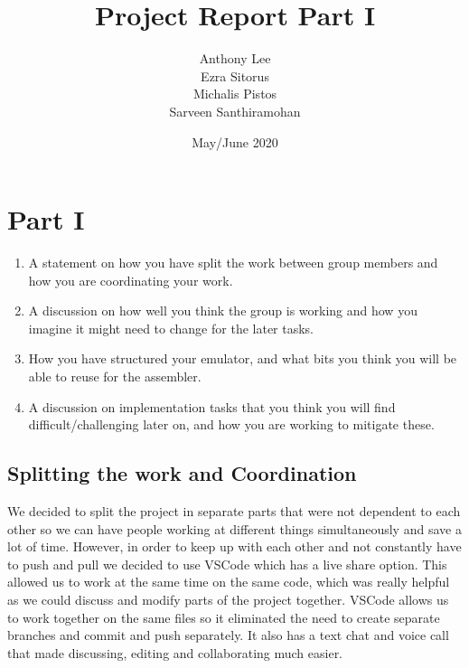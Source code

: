 \documentclass{article}
\title{Project Report Part I}
\author{Anthony Lee\\ Ezra Sitorus\\ Michalis Pistos\\Sarveen Santhiramohan}
\date{May/June 2020}
\begin{document}
\maketitle

\section{Part I}

\begin{enumerate}
    \item A statement on how you have split the work between group members and how you are coordinating
     your work.
    \item A discussion on how well you think the group is working and how you imagine it might need to
     change for the later tasks.
    \item How you have structured your emulator, and what bits you think you will be able to reuse for the
     assembler.
    \item A discussion on implementation tasks that you think you will find difficult/challenging later on,
     and how you are working to mitigate these.
\end{enumerate}

\bigskip
\bigskip
\subsection{Splitting the work and Coordination}
 We decided to split the project in separate parts that were not dependent to each other so 
 we can have people working at different things simultaneously and save a lot of time.
 However, in order to keep up with each other and not constantly have to push and pull 
 we decided to use VSCode which has a live share option. This allowed us 
 to work at the same time on the same code, which was really helpful as we could discuss and modify 
 parts of the project together. VSCode allows us to work together on the same files so it eliminated the need
 to create separate branches and commit and push separately. It also has a text chat and voice call that made
 discussing, editing and collaborating much easier.

\bigskip
\end{document}
